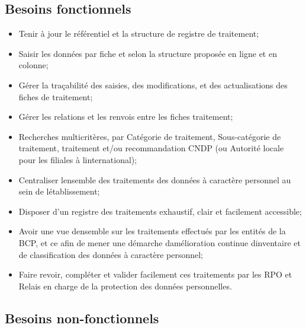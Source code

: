 \subsection{Besoins fonctionnels}
\vspace{.4cm}
\begin{itemize}
    \item Tenir à jour le référentiel et la structure de registre de traitement; \vspace{.2cm}
    \item Saisir les données par fiche et selon la structure proposée en ligne et en colonne; \vspace{.2cm}
    \item Gérer la traçabilité des saisies, des modifications, et des actualisations des fiches de traitement; \vspace{.2cm}
    \item Gérer les relations et les renvois entre les fiches traitement; \vspace{.2cm}
    \item Recherches multicritères, par Catégorie de traitement, Sous-catégorie de traitement, traitement et/ou recommandation CNDP (ou Autorité locale pour les filiales à linternational); \vspace{.2cm}
    \item Centraliser lensemble des traitements des données à caractère personnel au sein de létablissement; \vspace{.2cm}
    \item Disposer d'un registre des traitements exhaustif, clair et facilement accessible; \vspace{.2cm}
    \item Avoir une vue densemble sur les traitements effectués par les entités de la BCP, et ce afin de mener une démarche damélioration continue dinventaire et de classification des données à caractère personnel; \vspace{.2cm}
    \item Faire revoir, compléter et valider facilement ces traitements par les RPO et Relais en charge de la protection des données personnelles.
\end{itemize}


\subsection{Besoins non-fonctionnels}

